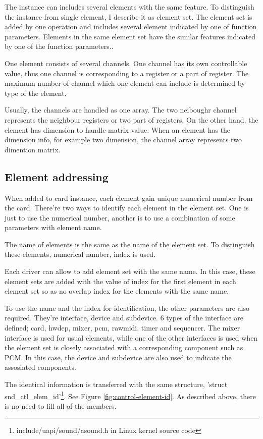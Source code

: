 \documentclass[onecolumn]{article}
\begin{document}
The instance can includes several elements with the same feature. To distinguish the instance from single element, I describe it as element set. The element set is added by one operation and includes several element indicated by one of function parameters. Elements in the same element set have the similar features indicated by one of the function parameters..

One element consists of several channels. One channel has its own controllable value, thus one channel is corresponding to a register or a part of register. The maximum number of channel which one element can include is determined by type of the element.

Usually, the channels are handled as one array. The two neiboughr channel represents the neighbour registers or two part of registers. On the other hand, the element has dimension to handle matrix value. When an element has the dimension info, for example two dimension, the channel array represents two dimention matrix.


\subsection{Element addressing}

When added to card instance, each element gain unique numerical number from the card. There're two ways to identify each element in the element set. One is just to use the numerical number, another is to use a combination of some parameters with element name.

The name of elements is the same as the name of the element set. To distinguish these elements, numerical number, index is used.

Each driver can allow to add element set with the same name. In this case, these element sets are added with the value of index for the first element in each element set so as no overlap index for the elements with the same name.

To use the name and the index for identification, the other parameters are also required. They're interface, device and subdevice. 6 types of the interface are defined; card, hwdep, mixer, pcm, rawmidi, timer and sequencer. The mixer interface is used for usual elements, while one of the other interfaces is used when the element set is closely associated with a corresponding component such as PCM. In this case, the device and subdevice are also used to indicate the assosiated components\cite{alsa-driver}.

The identical information is transferred with the same structure, 'struct snd\_ctl\_elem\_id'\footnote{include/uapi/sound/asound.h in Linux kernel source code}. See Figure \ref{fig:control-element-id}. As described above, there is no need to fill all of the members.
\end{document}
